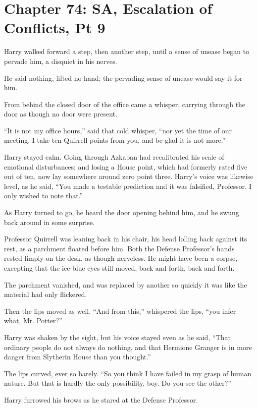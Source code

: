 \chapter{Chapter 74: SA, Escalation of Conflicts, Pt 9}
Harry walked forward a step, then another step, until a sense of unease
began to pervade him, a disquiet in his nerves.

He said nothing, lifted no hand; the pervading sense of unease would say
it for him.

From behind the closed door of the office came a whisper, carrying
through the door as though no door were present.

``It is not my office hours,'' said that cold whisper, ``nor yet the
time of our meeting. I take ten Quirrell points from you, and be glad it
is not more.''

Harry stayed calm. Going through Azkaban had recalibrated his scale of
emotional disturbances; and losing a House point, which had formerly
rated five out of ten, now lay somewhere around zero point three.
Harry's voice was likewise level, as he said, ``You made a testable
prediction and it was falsified, Professor. I only wished to note
that.''

As Harry turned to go, he heard the door opening behind him, and he
swung back around in some surprise.

Professor Quirrell was leaning back in his chair, his head lolling back
against its rest, as a parchment floated before him. Both the Defense
Professor's hands rested limply on the desk, as though nerveless. He
might have been a corpse, excepting that the ice-blue eyes still moved,
back and forth, back and forth.

The parchment vanished, and was replaced by another so quickly it was
like the material had only flickered.

Then the lips moved as well. ``And from this,'' whispered the lips,
``you infer what, Mr. Potter?''

Harry was shaken by the sight, but his voice stayed even as he said,
``That ordinary people do not always do nothing, and that Hermione
Granger is in more danger from Slytherin House than you thought.''

The lips curved, ever so barely. ``So you think I have failed in my
grasp of human nature. But that is hardly the only possibility, boy. Do
you see the other?''

Harry furrowed his brows as he stared at the Defense Professor.

